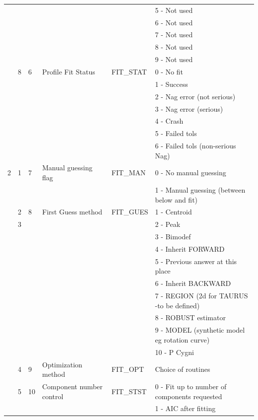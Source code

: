\begin{latexonly}
\begin{table}
\begin{center}
\begin{tabular}{|l|l|l|l|l|l|}
  &   &   & & & 5 - Not used \\
  &   &   & & & 6 - Not used\\
  &   &   & & & 7 - Not used\\
  &   &   & & & 8 - Not used\\
  &   &   & & & 9 - Not used\\ \cline{2-6}
  & 8 & 6 & Profile Fit Status & FIT\_STAT & 0 - No fit \\
  &   &   &                    & & 1 - Success \\
  &   &   &                    & & 2 - Nag error (not serious)\\
  &   &   &                    & & 3 - Nag error (serious)\\
  &   &   &                    & & 4 - Crash \\
  &   &   &                    & & 5 - Failed tols\\
  &   &   &                & & 6 - Failed tols (non-serious Nag)\\ \hline
2 & 1 & 7 & Manual guessing flag & FIT\_MAN & 0 - No manual guessing\\
  &   &   & & &  1 - Manual guessing (between below and fit)\\ \cline{2-6}
  & 2 & 8 & First Guess method & FIT\_GUES & 1 - Centroid \\
  & 3 &   &                    & &  2 - Peak\\
  &   &   &                    & &  3 - Bimodef\\
  &   &   &                    & &  4 - Inherit FORWARD\\
  &   &   &                    & &  5 - Previous answer at this place\\
  &   &   &                    & &  6 - Inherit BACKWARD\\
  &   &   &              & &  7 - REGION (2d for TAURUS -to be defined)\\
  &   &   &                    & &  8 - ROBUST estimator\\
  &   &   &                    & &  9 - MODEL (synthetic model eg
rotation curve)\\
  &   &   &                    & &  10 - P Cygni\\ \cline{2-6}
  & 4 & 9 & Optimization method & FIT\_OPT & Choice of routines\\ \cline{2-6}
  & 5 & 10 & Component number control & FIT\_STST &
                       0 - Fit up to number of components requested\\
  &   &   &  & &         1 - AIC after fitting\\

\end{tabular}
\end{center}
\end{table}
\end{latexonly}
